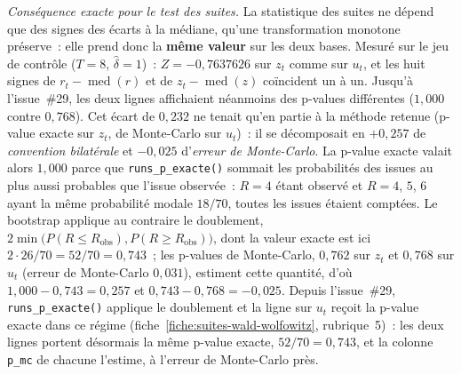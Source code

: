 \documentclass[a4paper,11pt]{article}
\newcommand{\code}[1]{\texttt{\small #1}}
\begin{document}
\emph{Conséquence exacte pour le test des suites.} La statistique des suites ne
dépend que des signes des écarts à la médiane, qu'une transformation monotone
préserve~: elle prend donc la \textbf{même valeur} sur les deux bases. Mesuré
sur le jeu de contrôle ($T = 8$, $\hat\delta = 1$)~: $Z = -0{,}7637626$ sur
$z_t$ comme sur $u_t$, et les huit signes de $r_t - \operatorname{med}(r)$ et de
$z_t - \operatorname{med}(z)$ coïncident un à un. Jusqu'à l'issue~\#29, les
deux lignes affichaient néanmoins des p-values différentes ($1{,}000$ contre
$0{,}768$). Cet écart de $0{,}232$ ne tenait qu'en partie à la méthode retenue
(p-value exacte sur $z_t$, de Monte-Carlo sur $u_t$)~: il se décomposait en
$+0{,}257$ de \emph{convention bilatérale} et $-0{,}025$ d'\emph{erreur de
Monte-Carlo}. La p-value exacte valait alors $1{,}000$ parce que
\code{runs\_p\_exacte()} sommait les probabilités des issues au plus aussi
probables que l'issue observée~: $R = 4$ étant observé et $R = 4$, $5$, $6$
ayant la même probabilité modale $18/70$, toutes les issues étaient comptées.
Le bootstrap applique au contraire le doublement, $2\min\big(P(R \le R_{\text{obs}}),
P(R \ge R_{\text{obs}})\big)$, dont la valeur exacte est ici
$2 \cdot 26/70 = 52/70 = 0{,}743$~; les p-values de Monte-Carlo, $0{,}762$ sur
$z_t$ et $0{,}768$ sur $u_t$ (erreur de Monte-Carlo $0{,}031$), estiment cette
quantité, d'où $1{,}000 - 0{,}743 = 0{,}257$ et $0{,}743 - 0{,}768 = -0{,}025$.
Depuis l'issue~\#29, \code{runs\_p\_exacte()} applique le doublement et la
ligne sur $u_t$ reçoit la p-value exacte dans ce régime
(fiche~\ref{fiche:suites-wald-wolfowitz}, rubrique~5)~: les deux lignes portent
désormais la même p-value exacte, $52/70 = 0{,}743$, et la colonne
\code{p\_mc} de chacune l'estime, à l'erreur de Monte-Carlo près.
\end{document}
